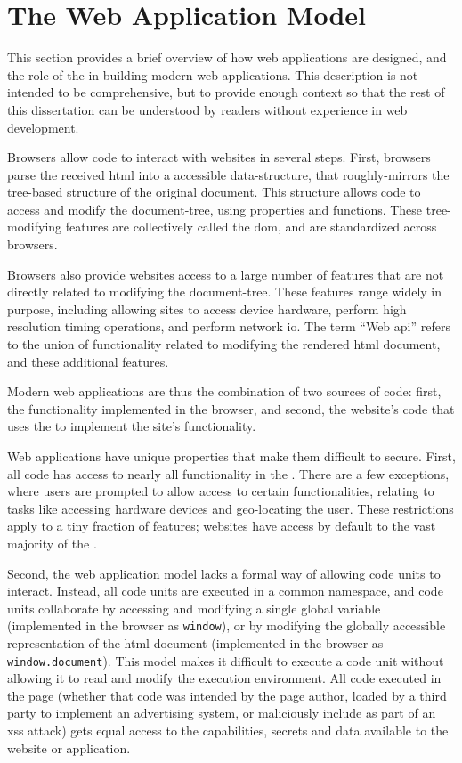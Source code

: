 \section{The Web Application Model}
\label{background:web-application-model}

This section provides a brief overview of how web applications are designed,
and the role of the \WAPI in building modern web applications.
This description is not intended to be comprehensive, but to provide enough
context so that the rest of this dissertation can be understood
by readers without experience in web development.

Browsers allow \JS code to interact with websites in several steps. First,
browsers parse the received \gls{html} into a \JS accessible data-structure,
that roughly-mirrors the tree-based structure of the original document.
This structure allows \JS code to access and modify the document-tree,
using \JS properties and functions.  These tree-modifying \JS features are
collectively called the \gls{dom}, and are standardized across browsers.

Browsers also provide websites access to a large number of \JS features
that are not directly related to modifying the document-tree.  These
features range widely in purpose, including allowing sites to
access device hardware, perform high resolution timing operations, and
perform network \gls{io}.  The term ``Web \gls{api}'' refers to the union of
functionality related to modifying the rendered \gls{html} document, and
these additional \JS features.

Modern web applications are thus the combination of two sources of code:
first, the \WAPI functionality implemented in the browser, and second,
the website's \JS code that uses the \WAPI to implement the site's functionality.

Web applications have unique properties that make them difficult to secure.
First, all \JS code has access to nearly all functionality in the \WAPI.
There are a few exceptions, where users are
prompted to allow access to certain functionalities, relating
to tasks like accessing hardware devices and geo-locating the user.  These
restrictions apply to a tiny fraction of features; websites have
access by default to the vast majority of the \WAPI.

Second, the web application model lacks a formal
way of allowing code units to interact.  Instead, all code units are
executed in a common namespace, and code units collaborate by accessing and
modifying a single global variable (implemented in the browser as
\texttt{window}), or by modifying the globally accessible representation of the
\gls{html} document (implemented in the browser as \texttt{window.document}).
This model makes it difficult to execute a code unit without allowing
it to read and modify the execution environment.  All code executed in the
page (whether that code was intended by the page author, loaded by a third
party to implement an advertising system, or maliciously include as part of
an \gls{xss} attack) gets equal access to the capabilities, secrets and data
available to the website or application.

